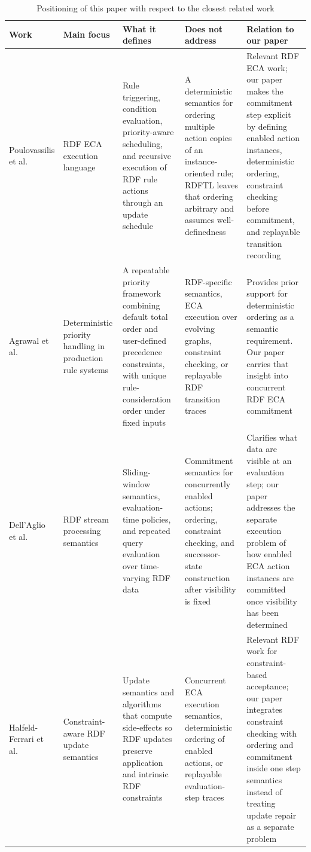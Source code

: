 \documentclass{ieeeaccess}
\theoremstyle{definition}
\theoremstyle{plain}
\theoremstyle{remark}
\begin{document}
\begin{table}[!t]
\caption{Positioning of this paper with respect to the closest related work}
\label{tab:related-work-comparison}
\centering
\small
\begin{tabular}{|p{1.5cm}|p{2.0cm}|p{4.3cm}|p{4.3cm}|p{3.9cm}|}
\hline
\textbf{Work} & \textbf{Main focus} & \textbf{What it defines} & \textbf{Does not address} & \textbf{Relation to our paper} \\
\hline

 Poulovassilis et al. \cite{papamarkos} & RDF ECA execution language & Rule triggering, condition evaluation, priority-aware scheduling, and recursive execution of RDF rule actions through an update schedule & A deterministic semantics for ordering multiple action copies of an instance-oriented rule; RDFTL leaves that ordering arbitrary and assumes well-definedness & Relevant RDF ECA work; our paper makes the commitment step explicit by defining enabled action instances, deterministic ordering, constraint checking before commitment, and replayable transition recording \\
\hline

Agrawal et al. \cite{agrawal} & Deterministic priority handling in production rule systems & A repeatable priority framework combining default total order and user-defined precedence constraints, with unique rule-consideration order under fixed inputs & RDF-specific semantics, ECA execution over evolving graphs, constraint checking, or replayable RDF transition traces & Provides prior support for deterministic ordering as a semantic requirement. Our paper carries that insight into concurrent RDF ECA commitment \\
\hline

Dell’Aglio et al. \cite{DellAglio2014RSPQL} & RDF stream processing semantics & Sliding-window semantics, evaluation-time policies, and repeated query evaluation over time-varying RDF data & Commitment semantics for concurrently enabled actions; ordering, constraint checking, and successor-state construction after visibility is fixed & Clarifies what data are visible at an evaluation step; our paper addresses the separate execution problem of how enabled ECA action instances are committed once visibility has been determined \\
\hline

Halfeld-Ferrari et al. \cite{ferrari} & Constraint-aware RDF update semantics & Update semantics and algorithms that compute side-effects so RDF updates preserve application and intrinsic RDF constraints & Concurrent ECA execution semantics, deterministic ordering of enabled actions, or replayable evaluation-step traces & Relevant RDF work for constraint-based acceptance; our paper integrates constraint checking with ordering and
commitment inside one step semantics instead of treating update repair as a separate problem \\
\hline


\end{tabular}
\end{table}
\end{document}
